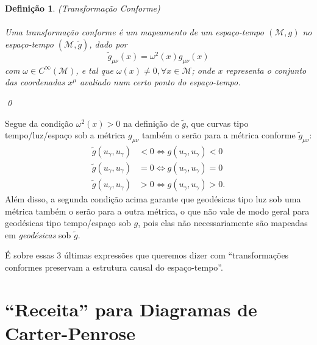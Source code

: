 \documentclass[12pt, a4paper]{article}
\theoremstyle{meuremarkstyle}
\theoremstyle{definicao}
\newtheorem*{definição}{Definição}
\begin{document}
\begin{definição}
(Transformação Conforme)\\\\
Uma \textit{transformação conforme} é um mapeamento de um espaço-tempo $(\mathcal{M},g)$
no espaço-tempo $(\mathcal{M},\tilde{g})$, dado por
\begin{equation*}
  \tilde{g}_{\mu\nu}(x) = \omega^2(x)g_{\mu\nu}(x)
\end{equation*}
com $\omega \in C^{\infty}(\mathcal{M})$, e tal que $\omega(x) \neq 0, \forall x \in \mathcal{M}$; onde $x$ representa o conjunto das coordenadas $x^{\mu}$ avaliado num certo ponto do espaço-tempo.
\begin{flushright}
  \qed
\end{flushright}
\end{definição}
Segue da condição $\omega^2(x)>0$ na definição de $\tilde{g}$, que curvas tipo tempo/luz/espaço sob a métrica $g_{\mu\nu}$ também o serão para a 
métrica conforme $\tilde{g}_{\mu\nu}$:
\begin{align*}
   \tilde{g}(u_{\gamma},u_{\gamma}) &< 0 \Longleftrightarrow  g(u_{\gamma},u_{\gamma}) < 0\\
   \tilde{g}(u_{\gamma},u_{\gamma}) &= 0 \Longleftrightarrow  g(u_{\gamma},u_{\gamma}) = 0\\
   \tilde{g}(u_{\gamma},u_{\gamma}) &> 0 \Longleftrightarrow  g(u_{\gamma},u_{\gamma}) > 0.
\end{align*}
Além disso, a segunda condição acima garante que geodésicas tipo luz sob uma métrica também o serão
para a outra métrica, o que não vale de modo geral para geodésicas tipo tempo/espaço sob $g$, pois elas não necessariamente são mapeadas em \textit{geodésicas} sob $\tilde{g}$.

É sobre essas 3 últimas expressões que queremos dizer com \enquote{transformações conformes preservam a estrutura causal do espaço-tempo}.
\section{\enquote{Receita} para Diagramas de Carter-Penrose}

\end{document}
